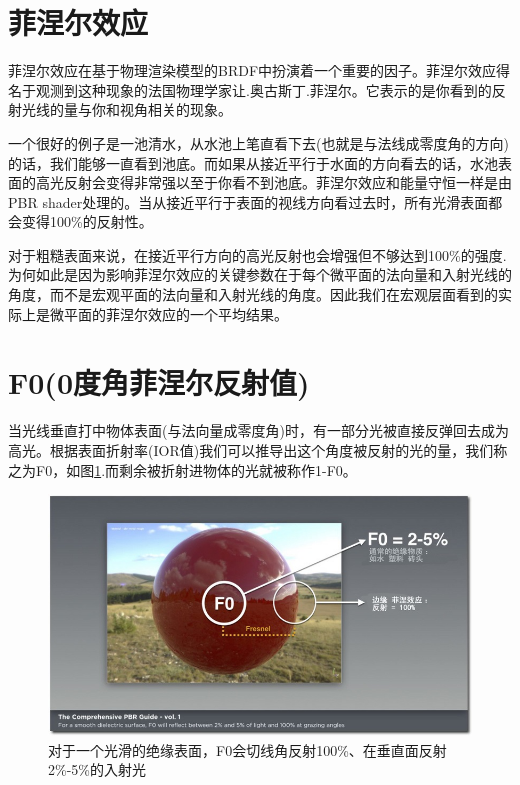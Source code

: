 \section{菲涅尔效应}

菲涅尔效应在基于物理渲染模型的BRDF中扮演着一个重要的因子。菲涅尔效应得名于观测到这种现象的法国物理学家让.奥古斯丁.菲涅尔。它表示的是你看到的反射光线的量与你和视角相关的现象。

一个很好的例子是一池清水，从水池上笔直看下去(也就是与法线成零度角的方向)的话，我们能够一直看到池底。而如果从接近平行于水面的方向看去的话，水池表面的高光反射会变得非常强以至于你看不到池底。菲涅尔效应和能量守恒一样是由PBR shader处理的。当从接近平行于表面的视线方向看过去时，所有光滑表面都会变得100\%的反射性。

对于粗糙表面来说，在接近平行方向的高光反射也会增强但不够达到100\%的强度.为何如此是因为影响菲涅尔效应的关键参数在于每个微平面的法向量和入射光线的角度，而不是宏观平面的法向量和入射光线的角度。因此我们在宏观层面看到的实际上是微平面的菲涅尔效应的一个平均结果。

\section{F0(0度角菲涅尔反射值)}

当光线垂直打中物体表面(与法向量成零度角)时，有一部分光被直接反弹回去成为高光。根据表面折射率(IOR值)我们可以推导出这个角度被反射的光的量，我们称之为F0，如图\ref{fig:chap1_9}.而剩余被折射进物体的光就被称作1-F0。

\begin{figure}[ht]
    \centering
	\includegraphics[width=\textwidth]{images/chap1_9.jpg}
	\caption{对于一个光滑的绝缘表面，F0会切线角反射100\%、在垂直面反射2\%-5\%的入射光}
    \label{fig:chap1_9}
\end{figure}

